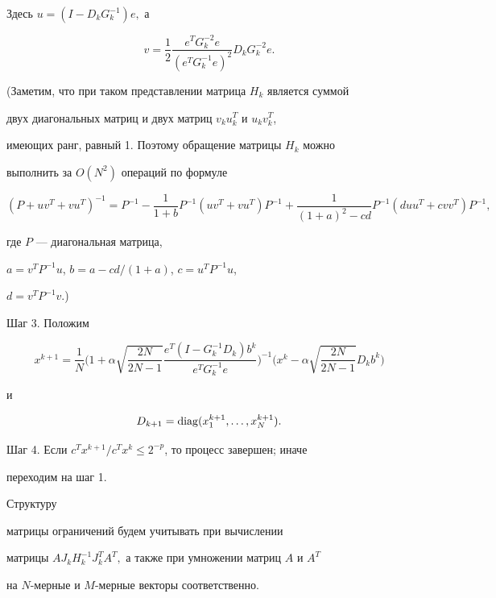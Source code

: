 Здесь $u=(I-D_kG_k^{-1})e,$ а


$$


v=\frac{1}{2}\frac{e^TG_k^{-2}e}{(e^TG_k^{-1}e)^2}D_kG_k^{-2}e.


$$


(Заметим, что при таком представлении матрица $H_k$ является суммой


двух диагональных матриц и двух матриц $v_ku_k^T$ и $u_kv_k^T$,


имеющих ранг, равный 1. Поэтому обращение матрицы $H_k$ можно


выполнить за $O(N^2)$ операций по формуле


$$


(P+uv^T+vu^T)^{-1}=P^{-1}-\frac{1}{1+b}P^{-1}(uv^T+vu^T)P^{-1}+


\frac{1}{(1+a)^2-cd}P^{-1}(duu^T+cvv^T)P^{-1},


$$


где $P$ --- диагональная матрица,


$a = v^TP^{-1}u$, $b=a-cd/(1+a)$, $c=u^TP^{-1}u$,


$d=v^TP^{-1}v$.)





Шаг 3. Положим


$$


x^{k+1}=\frac{1}{N}\Bigg(1+\alpha\sqrt{\frac{2N}{2N-1}}


\frac{e^T(I-G^{-1}_kD_k)b^k}{e^TG_k^{-1}e}\Bigg)^{-1}


\Bigg(x^k-\alpha\sqrt{\frac{2N}{2N-1}}D_kb^k\Bigg)


$$


и


$$


D_{k+1}=\diag(x_1^{k+1},\dotsc,x_N^{k+1}).


$$





Шаг 4. Если $c^Tx^{k+1}/c^Tx^k\leq 2^{-p}$, то процесс завершен; иначе


переходим на шаг 1.





Структуру


матрицы ограничений будем учитывать при вычислении


матрицы $AJ_kH_k^{-1}J_k^TA^T,$ а также при умножении матриц $A$ и $A^T$


на $N$-мерные и $M$-мерные векторы соответственно.





